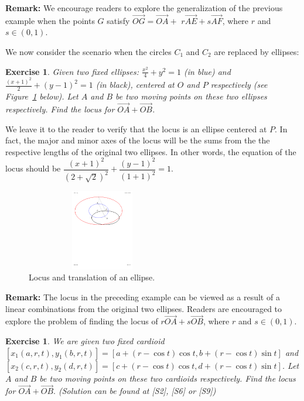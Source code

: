 \documentclass[12pt,a4paper]{article}%
\newtheorem{exercise}[theorem]{Exercise}
\begin{document}
\textbf{Remark:}
We encourage readers to explore the generalization of the previous
example when the points $G$ satisfy
$\overrightarrow{OG}=\overrightarrow{OA}+$ $r\overrightarrow{AE}+s\overrightarrow{AF}$,
where $r$ and $s\in(0,1)$.

We now consider the scenario when the circles $C_1$ and $C_2$ are replaced by ellipses:

\begin{exercise} \label{ex5}
Given two fixed ellipses: $\frac{x^{2}}{4}+y^{2}=1$ (in blue) and
$\frac{\left(  x+1\right)  ^{2}}{2}+(y-1)^{2}=1$ (in black), centered at $O$
and $P$ respectively (see Figure~\ref{fig7} below). Let $A$ and $B$ be two moving points
on these two ellipses respectively. Find the locus for
$\overrightarrow{OA}+\overrightarrow{OB}$.
\end{exercise}

We leave it to the reader to verify that the locus is an ellipse centered at
$P$. In fact, the major and minor axes of the locus will be the sums
from the the respective lengths of the original two ellipses. In other
words, the equation of the locus should be
$\dfrac{\left(  x+1\right)^{2}}{\left(  2+\sqrt{2}\right)^{2}}+\dfrac{(y-1)^{2}}{(1+1)^2}=1$.

\begin{figure}[htbp]
\begin{center}
 \includegraphics[natheight=2.720400in,natwidth=5.149800in,height=1.3917in,width=2.621in]{eJMT-1.pdf}
\end{center}
 \caption{Locus and translation of an ellipse.}
 \label{fig7}
\end{figure}

\textbf{Remark:}
The locus in the preceding example can be viewed as a result of a
linear combinations from the original two ellipses.
Readers are encouraged to explore the problem of finding the locus of
$r\overrightarrow{OA}+s\overrightarrow{OB}$, where $r$ and $s\in(0,1)$.

\begin{exercise} \label{ex6}
We are given two fixed cardioid $[x_{1}(a,r,t),y_{1}(b,r,t)]=[a+(r-\cos t)\cos
t,b+(r-\cos t)\sin t]$ and $[x_{2}(c,r,t),y_{2}(d,r,t)]=[c+(r-\cos t)\cos
t,d+(r-\cos t)\sin t]$. Let $A$ and $B$ be two moving points on these two
cardioids respectively. Find the locus for $\overrightarrow{OA}%
+\overrightarrow{OB}.$ (Solution can be found at [S2], [S6] or [S9])
\end{exercise}
\end{document}

